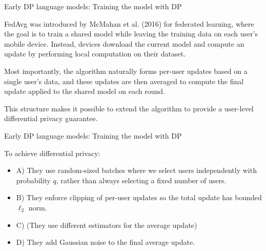 \documentclass[12pt,aspectratio=169,handout]{beamer}
\begin{document}
\begin{frame}{Early DP language models: Training the model with DP}

FedAvg was introduced by McMahan et al. (2016) for federated learning, where the goal is to train a shared model while leaving the training data on each user’s mobile device. Instead, devices download the current model and compute an update by performing local computation on their dataset.

Most importantly, the algorithm naturally forms per-user updates based on a single user’s data, and these updates are then averaged to compute the final update applied to the shared model on each round.

This structure makes it possible to extend the algorithm to provide a user-level differential privacy guarantee.


\end{frame}


\begin{frame}{Early DP language models: Training the model with DP}

To achieve differential privacy:

\begin{itemize}
\item A) They use random-sized batches where we select users independently with probability $q$, rather than always selecting a fixed number of users.
\item B) They enforce clipping of per-user updates so the total update has bounded $\ell_2$ norm.
\item C) (They use different estimators for the average update)
\item D) They add Gaussian noise to the final average update.
\end{itemize}



\end{frame}
\end{document}
